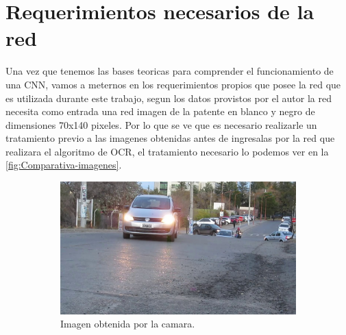\section{Requerimientos necesarios de la red}
Una vez que tenemos las bases teoricas para comprender el funcionamiento de una CNN, vamos a meternos en los requerimientos propios que posee
la red que es utilizada durante este trabajo, segun los datos provistos por el autor la red necesita como entrada una red imagen de la patente
en blanco y negro de dimensiones 70x140 pixeles.
Por lo que se ve que es necesario realizarle un tratamiento previo a las imagenes obtenidas antes de ingresalas por la red que realizara el
algoritmo de OCR, el tratamiento necesario lo podemos ver en la \ref{fig:Comparativa-imagenes}.
\begin{figure}[!tbp]
    \centering
    \begin{subfigure}[b]{0.49\textwidth}
        \includegraphics[width=\textwidth, height=\textwidth]{imgs/imagen-obtenida.jpg}
        \caption{Imagen obtenida por la camara.}
        \label{fig:imagen-obtenida}
    \end{subfigure}
    \hfill
    \begin{subfigure}[b]{0.49\textwidth}

\end{subfigure}
\end{figure}
